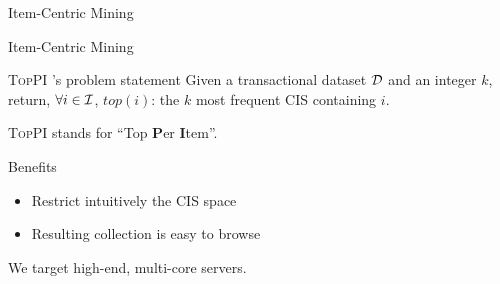 \documentclass[table]{beamer}
\providecommand{\toppi}{\mbox{\textsc{TopPI}} }
\begin{document}
\begin{frame}[t]{Item-Centric Mining}
  \begin{center}
  \end{center}
\end{frame}

\begin{frame}{Item-Centric Mining}
  \begin{block}{\toppi's problem statement}
    Given a transactional dataset $\cal D$ and an integer $k$,\\
    return, $\forall i \in {\cal I}$, $\mathit{top}(i)$:
    the $k$ most frequent CIS containing $i$.
  \end{block}
  \vspace{1em}
  \toppi stands for ``Top {\bf P}er {\bf I}tem''.
  \vspace{1em}
  \pause
  \begin{block}{Benefits}
    \begin{itemize}
      \item Restrict intuitively the CIS space
      \pause
      \item Resulting collection is easy to browse
    \end{itemize}
  \end{block}
  \pause
  We target high-end, multi-core servers.
\end{frame}
\end{document}
